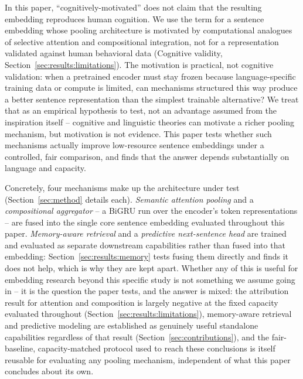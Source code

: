 \documentclass[manuscript]{acmart}
\begin{document}
In this paper, ``cognitively-motivated'' does not claim that the resulting embedding reproduces human cognition. We use the term for a sentence embedding whose pooling architecture is motivated by computational analogues of selective attention and compositional integration, not for a representation validated against human behavioral data (Cognitive validity, Section~\ref{sec:results:limitations}). The motivation is practical, not cognitive validation: when a pretrained encoder must stay frozen because language-specific training data or compute is limited, can mechanisms structured this way produce a better sentence representation than the simplest trainable alternative? We treat that as an empirical hypothesis to test, not an advantage assumed from the inspiration itself -- cognitive and linguistic theories can motivate a richer pooling mechanism, but motivation is not evidence. This paper tests whether such mechanisms actually improve low-resource sentence embeddings under a controlled, fair comparison, and finds that the answer depends substantially on language and capacity.

Concretely, four mechanisms make up the architecture under test (Section~\ref{sec:method} details each). \emph{Semantic attention pooling} and a \emph{compositional aggregator} -- a BiGRU run over the encoder's token representations -- are fused into the single core sentence embedding evaluated throughout this paper. \emph{Memory-aware retrieval} and a \emph{predictive next-sentence head} are trained and evaluated as separate downstream capabilities rather than fused into that embedding: Section~\ref{sec:results:memory} tests fusing them directly and finds it does not help, which is why they are kept apart. Whether any of this is useful for embedding research beyond this specific study is not something we assume going in -- it is the question the paper tests, and the answer is mixed: the attribution result for attention and composition is largely negative at the fixed capacity evaluated throughout (Section~\ref{sec:results:limitations}), memory-aware retrieval and predictive modeling are established as genuinely useful standalone capabilities regardless of that result (Section~\ref{sec:contributions}), and the fair-baseline, capacity-matched protocol used to reach these conclusions is itself reusable for evaluating any pooling mechanism, independent of what this paper concludes about its own.
\end{document}

